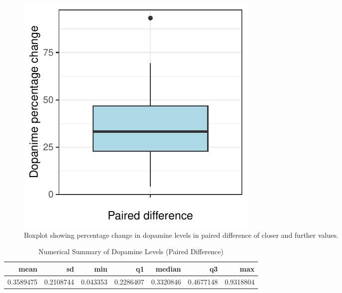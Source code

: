\documentclass{article}\usepackage[]{graphicx}\usepackage[]{xcolor}
\makeatletter
\def\maxwidth{ %
  \ifdim\Gin@nat@width>\linewidth
    \linewidth
  \else
    \Gin@nat@width
  \fi
}
\newenvironment{knitrout}{}{} %
\makeatother
\begin{document}
\begin{enumerate}
\begin{enumerate}
\begin{figure}[H]
\centering
\begin{knitrout}
\color{fgcolor}
\includegraphics[width=\maxwidth]{figure/unnamed-chunk-11-1} 
\end{knitrout}
\caption{Boxplot showing percentage change in dopamine levels in paired difference of closer and further values.}
\end{figure}
\begin{table}

\caption{\label{tab:unnamed-chunk-12}Numerical Summary of Dopamine Levels (Paired Difference)}
\centering
\begin{tabular}[t]{r|r|r|r|r|r|r}
\hline
mean & sd & min & q1 & median & q3 & max\\
\hline
0.3589475 & 0.2108744 & 0.043353 & 0.2286407 & 0.3320846 & 0.4677148 & 0.9318804\\
\hline
\end{tabular}
\end{table}




\end{enumerate}
\end{enumerate}
\end{document}
